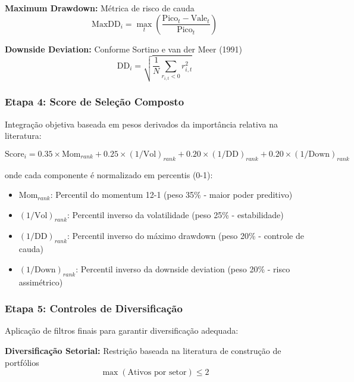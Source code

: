 \textbf{Maximum Drawdown:} Métrica de risco de cauda
\begin{equation}
\text{MaxDD}_i = \max_{t} \left( \frac{\text{Pico}_{t} - \text{Vale}_{t}}{\text{Pico}_{t}} \right)
\end{equation}

\textbf{Downside Deviation:} Conforme Sortino e van der Meer (1991)
\begin{equation}
\text{DD}_i = \sqrt{\frac{1}{N} \sum_{r_{i,t} < 0} r_{i,t}^2}
\end{equation}

\subsubsection{Etapa 4: Score de Seleção Composto}

Integração objetiva baseada em pesos derivados da importância relativa na literatura:

\begin{equation}
\text{Score}_i = 0.35 \times \text{Mom}_{rank} + 0.25 \times (1/\text{Vol})_{rank} + 0.20 \times (1/\text{DD})_{rank} + 0.20 \times (1/\text{Down})_{rank}
\end{equation}

onde cada componente é normalizado em percentis (0-1):
\begin{itemize}
    \item $\text{Mom}_{rank}$: Percentil do momentum 12-1 (peso 35\% - maior poder preditivo)
    \item $(1/\text{Vol})_{rank}$: Percentil inverso da volatilidade (peso 25\% - estabilidade)
    \item $(1/\text{DD})_{rank}$: Percentil inverso do máximo drawdown (peso 20\% - controle de cauda)
    \item $(1/\text{Down})_{rank}$: Percentil inverso da downside deviation (peso 20\% - risco assimétrico)
\end{itemize}

\subsubsection{Etapa 5: Controles de Diversificação}

Aplicação de filtros finais para garantir diversificação adequada:

\textbf{Diversificação Setorial:} Restrição baseada na literatura de construção de portfólios
\begin{equation}
\max(\text{Ativos por setor}) \leq 2
\end{equation}

